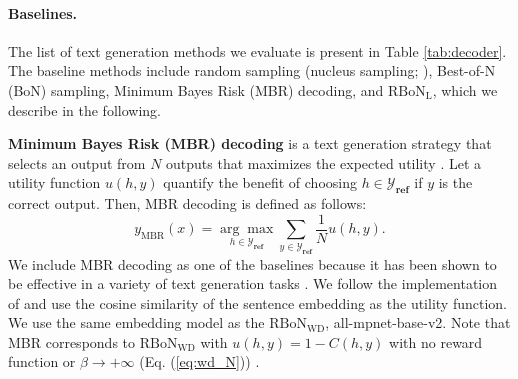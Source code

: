 \paragraph{Baselines.}
The list of text generation methods we evaluate is present in Table \ref{tab:decoder}.
The baseline methods include random sampling (nucleus sampling; \citealt{Holtzman2020The}), Best-of-N (BoN) sampling, Minimum Bayes Risk (MBR) decoding, and $\mathrm{RBoN}_{\mathrm{L}}$, which we describe in the following.

\textbf{Minimum Bayes Risk (MBR) decoding} \citep{kumar-byrne-2002-minimum,kumar-byrne-2004-minimum,eikema-aziz-2022-sampling} is a text generation strategy that selects an output from $N$ outputs that maximizes the expected utility \citep{Berger:1327974}. Let a utility function $u(h, y)$ quantify the benefit of choosing $h \in \mathcal{Y}_{\textbf{ref}}$ if $y$ is the correct output. Then, MBR decoding is defined as follows:
\begin{equation}
y_{\mathrm{MBR}}(x) = \underset{h \in \mathcal{Y}_{\textbf{ref}} }{\arg \max } \sum_{y \in \mathcal{Y}_{\textbf {ref}}} \frac{1}{N} u\left(h, y\right).
\end{equation}
We include MBR decoding as one of the baselines because it has been shown to be effective in a variety of text generation tasks \citep{suzgun-etal-2023-follow,bertsch-etal-2023-mbr,li2024agents,heineman2024improving}.
We follow the implementation of \cite{jinnai2024regularized} and use the cosine similarity of the sentence embedding as the utility function. We use the same embedding model as the $\mathrm{RBoN}_\mathrm{WD}$, all-mpnet-base-v2.
Note that MBR corresponds to $\mathrm{RBoN}_{\mathrm{WD}}$ with $u(h, y) = 1 - C(h, y)$ with no reward function or $\beta \rightarrow +\infty$ (Eq. (\ref{eq:wd_N})) \citep{jinnai2024regularized}.

